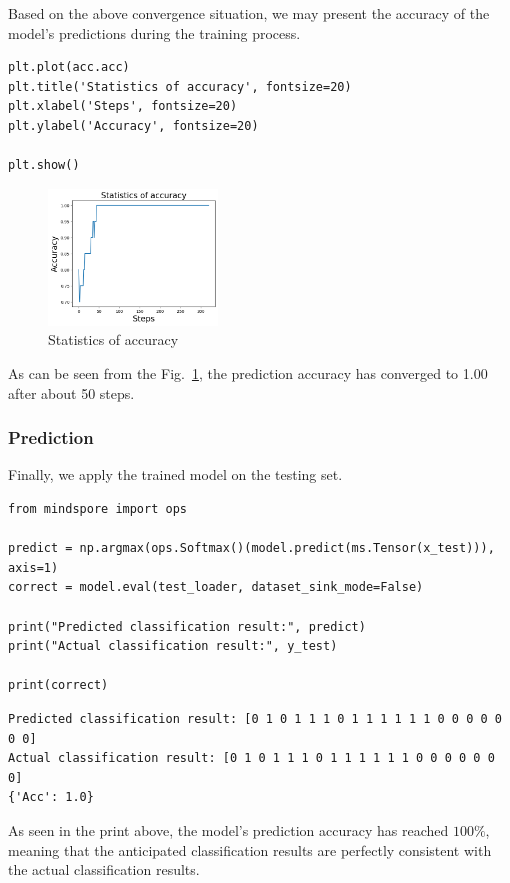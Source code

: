 Based on the above convergence situation, we may present the accuracy of the model's predictions during the training process. %

\begin{lstlisting}
plt.plot(acc.acc)
plt.title('Statistics of accuracy', fontsize=20)
plt.xlabel('Steps', fontsize=20)
plt.ylabel('Accuracy', fontsize=20)

plt.show()
\end{lstlisting}

\begin{figure}[H]
    \centering
    \includegraphics[width=0.4\textwidth]{5.1_figures/Statistics_of_accuracy.png}
    \caption{Statistics of accuracy}
    \label{5.1Statistics_of_accuracy}
\end{figure}

As can be seen from the Fig.~\ref{5.1Statistics_of_accuracy}, the prediction accuracy has converged to 1.00 after about 50 steps.

\subsubsection{Prediction}
Finally, we apply the trained model on the testing set.
\begin{lstlisting}
from mindspore import ops

predict = np.argmax(ops.Softmax()(model.predict(ms.Tensor(x_test))), axis=1)
correct = model.eval(test_loader, dataset_sink_mode=False)

print("Predicted classification result:", predict)
print("Actual classification result:", y_test)

print(correct)
\end{lstlisting}

\begin{lstlisting}
Predicted classification result: [0 1 0 1 1 1 0 1 1 1 1 1 1 0 0 0 0 0 0 0]
Actual classification result: [0 1 0 1 1 1 0 1 1 1 1 1 1 0 0 0 0 0 0 0]
{'Acc': 1.0}
\end{lstlisting}

As seen in the print above, the model's prediction accuracy has reached $100\%$, meaning that the anticipated classification results are perfectly consistent with the actual classification results.
